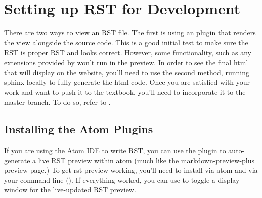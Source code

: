 \documentclass[letterpaper,10pt,english]{sphinxmanual}
\begin{document}
\section{Setting up RST for Development}
\label{\detokenize{Textbook_Creation_Help/rst_intro:setting-up-rst-for-development}}\label{\detokenize{Textbook_Creation_Help/rst_intro:setting-up-rst}}
There are two ways to  view an RST file. The first is using an  plugin that renders the view alongside the source code. This is a good initial test to make sure the RST is proper RST and looks  correct. However, some functionality, such as any extensions provided by  won’t run in the preview. In order to see the final html that will display on the website, you’ll need to use the second method, running sphinx locally to fully generate the html code. Once you are satisfied with your work and want to push it to the textbook, you’ll need to incorporate it to the master branch. To do so, refer to {\hyperref[\detokenize{Textbook_Creation_Help/rst_intro:id3}]{}}.


\subsection{Installing the Atom Plugins}
\label{\detokenize{Textbook_Creation_Help/rst_intro:installing-the-atom-plugins}}\label{\detokenize{Textbook_Creation_Help/rst_intro:installing-atom}}
If you are using the Atom IDE to write RST, you can use the  plugin to auto-generate a live RST preview within atom (much like the markdown-preview-plus preview page.) To get rst-preview working, you’ll need to install  via atom and  via your command line (). If everything worked, you can use  to toggle a display window for the live-updated RST preview.
\end{document}
